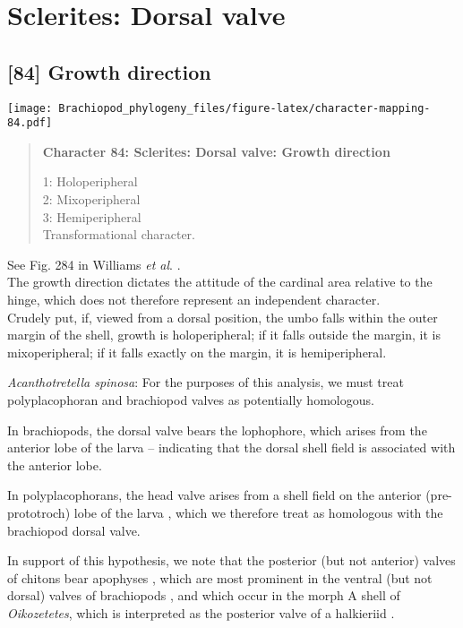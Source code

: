 \documentclass[openany]{book}
\theoremstyle{definition}
\theoremstyle{definition}
\theoremstyle{definition}
\theoremstyle{remark}
\begin{document}
\section{Sclerites: Dorsal valve}\label{sclerites-dorsal-valve}

\subsection*{{[}84{]} Growth direction}\label{growth-direction}

\texttt{[image: Brachiopod\_phylogeny\_files/figure-latex/character-mapping-84.pdf]}

\begin{quote}
\textbf{Character 84: Sclerites: Dorsal valve: Growth direction}

1: Holoperipheral\\
2: Mixoperipheral\\
3: Hemiperipheral\\
Transformational character.
\end{quote}

See Fig. 284 in Williams \emph{et al}.
\citeyearpar{Williams1997Introduction}.\\
The growth direction dictates the attitude of the cardinal area relative
to the hinge, which does not therefore represent an independent
character.\\
Crudely put, if, viewed from a dorsal position, the umbo falls within
the outer margin of the shell, growth is holoperipheral; if it falls
outside the margin, it is mixoperipheral; if it falls exactly on the
margin, it is hemiperipheral.

\hypertarget{Acanthotretella_spinosa-coding-84}{}
\emph{Acanthotretella spinosa}: For the purposes of this analysis, we
must treat polyplacophoran and brachiopod valves as potentially
homologous.

In brachiopods, the dorsal valve bears the lophophore, which arises from
the anterior lobe of the larva \citep{Altenburger2013} -- indicating
that the dorsal shell field is associated with the anterior lobe.

In polyplacophorans, the head valve arises from a shell field on the
anterior (pre-prototroch) lobe of the larva \citep{Wanninger2002C},
which we therefore treat as homologous with the brachiopod dorsal valve.

In support of this hypothesis, we note that the posterior (but not
anterior) valves of chitons bear apophyses
\citep{Schwabe2010, Connors2012}, which are most prominent in the
ventral (but not dorsal) valves of brachiopods \citep[fig.
322]{Williams1997Introduction}, and which occur in the morph A shell of
\emph{Oikozetetes}, which is interpreted as the posterior valve of a
halkieriid \citep{Paterson2009}.
\end{document}
